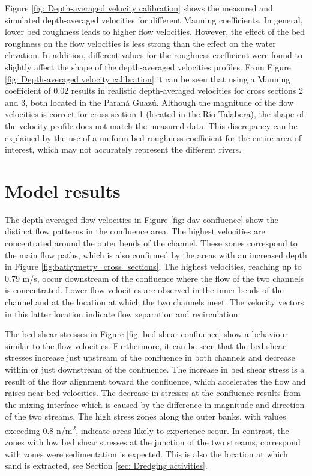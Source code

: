 Figure \ref{fig: Depth-averaged velocity calibration} shows the measured and simulated depth-averaged velocities for different Manning coefficients. In general, lower bed roughness leads to higher flow velocities. However, the effect of the bed roughness on the flow velocities is less strong than the effect on the water elevation. In addition, different values for the roughness coefficient were found to slightly affect the shape of the depth-averaged velocities profiles. From Figure \ref{fig: Depth-averaged velocity calibration} it can be seen that using a Manning coefficient of 0.02 results in realistic depth-averaged velocities for cross sections 2 and 3, both located in the Paraná Guazú. Although the magnitude of the flow velocities is correct for cross section 1 (located in the Río Talabera), the shape of the velocity profile does not match the measured data. This discrepancy can be explained by the use of a uniform bed roughness coefficient for the entire area of interest, which may not accurately represent the different rivers.

\section{Model results}
\label{sec:Delft3D results}
The depth-averaged flow velocities in Figure \ref{fig: dav confluence} show the distinct flow patterns in the confluence area. The highest velocities are concentrated around the outer bends of the channel. These zones correspond to the main flow paths, which is also confirmed by the areas with an increased depth in Figure \ref{fig:bathymetry_cross_sections}. The highest velocities, reaching up to 0.79 m/s, occur downstream of the confluence where the flow of the two channels is concentrated. Lower flow velocities are observed in the inner bends of the channel and at the location at which the two channels meet. The velocity vectors in this latter location indicate flow separation and recirculation. 

The bed shear stresses in Figure \ref{fig: bed shear confluence} show a behaviour similar to the flow velocities. Furthermore, it can be seen that the bed shear stresses increase just upstream of the confluence in both channels and decrease within or just downstream of the confluence. The increase in bed shear stress is a result of the flow alignment toward the confluence, which accelerates the flow and raises near-bed velocities. The decrease in stresses at the confluence results from the mixing interface which is caused by the difference in magnitude and direction of the two streams. The high stress zones along the outer banks, with values exceeding 0.8 n/m\textsuperscript{2}, indicate areas likely to experience scour. In contrast, the zones with low bed shear stresses at the junction of the two streams, correspond with zones were sedimentation is expected. This is also the location at which sand is extracted, see Section \ref{sec: Dredging activities}.
 
